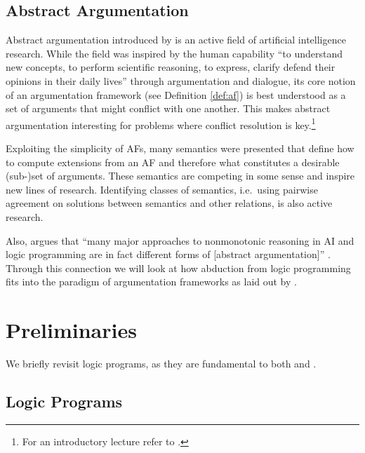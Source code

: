 \documentclass[a4paper]{article}
\begin{document}
\subsection{Abstract Argumentation}
\label{sec:arg}

Abstract argumentation introduced by \citet{DBLP:journals/ai/Dung95} is an active field of artificial intelligence research. While the field was inspired by the human capability \enquote{to understand new concepts, to perform scientific reasoning, to express, clarify defend their opinions in their daily lives} through argumentation and dialogue, its core notion of an argumentation framework (see Definition \ref{def:af}) is best understood as a set of arguments that might conflict with one another. This makes abstract argumentation interesting for problems where conflict resolution is key.\footnote{For an introductory lecture refer to \cite{baroni}.}

Exploiting the simplicity of AFs, many semantics were presented that define how to compute extensions from an AF and therefore what constitutes a desirable (sub-)set of arguments. These semantics are competing in some sense and inspire new lines of research. Identifying classes of semantics, i.e.~using pairwise agreement on solutions between semantics and other relations, is also active research.

Also, \citet{DBLP:journals/ai/Dung95} argues that \enquote{many major approaches to nonmonotonic reasoning in AI and logic programming are in fact different forms of [abstract argumentation]} \cite[Introduction, p.~325]{DBLP:journals/ai/Dung95}. Through this connection we will look at how abduction from logic programming fits into the paradigm of argumentation frameworks as laid out by \citet{DBLP:conf/ecai/BoothGKRT14}.

\section{Preliminaries}
\label{sec:prelim}

We briefly revisit logic programs, as they are fundamental to both \citep{DBLP:journals/logcom/ConsoleDT91} and \cite{DBLP:journals/tcs/EiterGL97}.

\subsection{Logic Programs}
\label{sec:prelim:lp}
\end{document}

